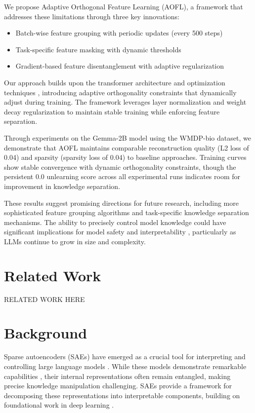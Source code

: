 \documentclass{article} %
\begin{document}
We propose Adaptive Orthogonal Feature Learning (AOFL), a framework that addresses these limitations through three key innovations:
\begin{itemize}
    \item Batch-wise feature grouping with periodic updates (every 500 steps)
    \item Task-specific feature masking with dynamic thresholds
    \item Gradient-based feature disentanglement with adaptive regularization
\end{itemize}

Our approach builds upon the transformer architecture \cite{vaswani2017attention} and optimization techniques \cite{kingma2014adam}, introducing adaptive orthogonality constraints that dynamically adjust during training. The framework leverages layer normalization \cite{ba2016layer} and weight decay regularization \cite{loshchilov2017adamw} to maintain stable training while enforcing feature separation.

Through experiments on the Gemma-2B model using the WMDP-bio dataset, we demonstrate that AOFL maintains comparable reconstruction quality (L2 loss of 0.04) and sparsity (sparsity loss of 0.04) to baseline approaches. Training curves show stable convergence with dynamic orthogonality constraints, though the persistent 0.0 unlearning score across all experimental runs indicates room for improvement in knowledge separation.

These results suggest promising directions for future research, including more sophisticated feature grouping algorithms and task-specific knowledge separation mechanisms. The ability to precisely control model knowledge could have significant implications for model safety and interpretability \cite{gpt4}, particularly as LLMs continue to grow in size and complexity.

\section{Related Work}
\label{sec:related}
RELATED WORK HERE

\section{Background}
\label{sec:background}

Sparse autoencoders (SAEs) have emerged as a crucial tool for interpreting and controlling large language models \cite{vaswani2017attention}. While these models demonstrate remarkable capabilities \cite{radford2019language}, their internal representations often remain entangled, making precise knowledge manipulation challenging. SAEs provide a framework for decomposing these representations into interpretable components, building on foundational work in deep learning \cite{goodfellow2016deep}.
\end{document}

